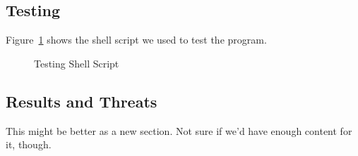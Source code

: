 \subsection{Testing}
Figure~\ref{fig:testScript} shows the shell script we used to test the program.

\begin{figure}[h]
	\caption{\label{fig:testScript} Testing Shell Script}
\end{figure}

\subsection{Results and Threats}
This might be better as a new section. Not sure if we'd have enough content for it, though.